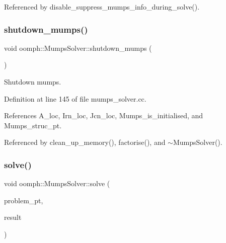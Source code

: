 Referenced by disable\+\_\+suppress\+\_\+mumps\+\_\+info\+\_\+during\+\_\+solve().

\mbox{\label{classoomph_1_1MumpsSolver_a5cf1f5e02e905d39e1b324dc921568f6}} 
\subsubsection{\texorpdfstring{shutdown\+\_\+mumps()}{shutdown\_mumps()}}
{\footnotesize\ttfamily void oomph\+::\+Mumps\+Solver\+::shutdown\+\_\+mumps (\begin{DoxyParamCaption}{ }\end{DoxyParamCaption})\hspace{0.3cm}{\ttfamily [private]}}



Shutdown mumps. 



Definition at line 145 of file mumps\+\_\+solver.\+cc.



References A\+\_\+loc, Irn\+\_\+loc, Jcn\+\_\+loc, Mumps\+\_\+is\+\_\+initialised, and Mumps\+\_\+struc\+\_\+pt.



Referenced by clean\+\_\+up\+\_\+memory(), factorise(), and $\sim$\+Mumps\+Solver().

\mbox{\label{classoomph_1_1MumpsSolver_ae0346a464f3ed74bfcca4063bdeed3ad}} 
\subsubsection{\texorpdfstring{solve()}{solve()}\hspace{0.1cm}{\footnotesize\ttfamily [1/2]}}
{\footnotesize\ttfamily void oomph\+::\+Mumps\+Solver\+::solve (\begin{DoxyParamCaption}\item[{\hyperlink{classoomph_1_1Problem}{Problem} $\ast$const \&}]{problem\+\_\+pt,  }\item[{\hyperlink{classoomph_1_1DoubleVector}{Double\+Vector} \&}]{result }\end{DoxyParamCaption})\hspace{0.3cm}{\ttfamily [virtual]}}



